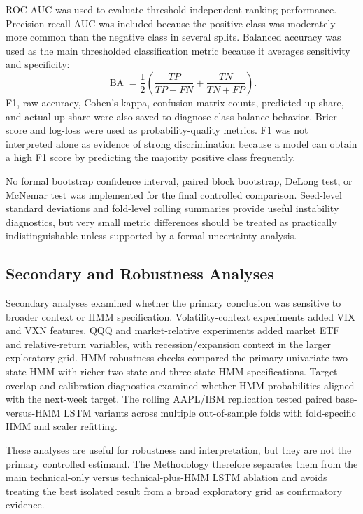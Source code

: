 ROC-AUC was used to evaluate threshold-independent ranking performance. Precision-recall AUC was included because the positive class was moderately more common than the negative class in several splits. Balanced accuracy was used as the main thresholded classification metric because it averages sensitivity and specificity:
\[
\operatorname{BA}=\frac{1}{2}\left(\frac{TP}{TP+FN}+\frac{TN}{TN+FP}\right).
\]
F1, raw accuracy, Cohen's kappa, confusion-matrix counts, predicted up share, and actual up share were also saved to diagnose class-balance behavior. Brier score and log-loss were used as probability-quality metrics. F1 was not interpreted alone as evidence of strong discrimination because a model can obtain a high F1 score by predicting the majority positive class frequently.

No formal bootstrap confidence interval, paired block bootstrap, DeLong test, or McNemar test was implemented for the final controlled comparison. Seed-level standard deviations and fold-level rolling summaries provide useful instability diagnostics, but very small metric differences should be treated as practically indistinguishable unless supported by a formal uncertainty analysis.

\subsection{Secondary and Robustness Analyses}

Secondary analyses examined whether the primary conclusion was sensitive to broader context or HMM specification. Volatility-context experiments added VIX and VXN features. QQQ and market-relative experiments added market ETF and relative-return variables, with recession/expansion context in the larger exploratory grid. HMM robustness checks compared the primary univariate two-state HMM with richer two-state and three-state HMM specifications. Target-overlap and calibration diagnostics examined whether HMM probabilities aligned with the next-week target. The rolling AAPL/IBM replication tested paired base-versus-HMM LSTM variants across multiple out-of-sample folds with fold-specific HMM and scaler refitting.

These analyses are useful for robustness and interpretation, but they are not the primary controlled estimand. The Methodology therefore separates them from the main technical-only versus technical-plus-HMM LSTM ablation and avoids treating the best isolated result from a broad exploratory grid as confirmatory evidence.

